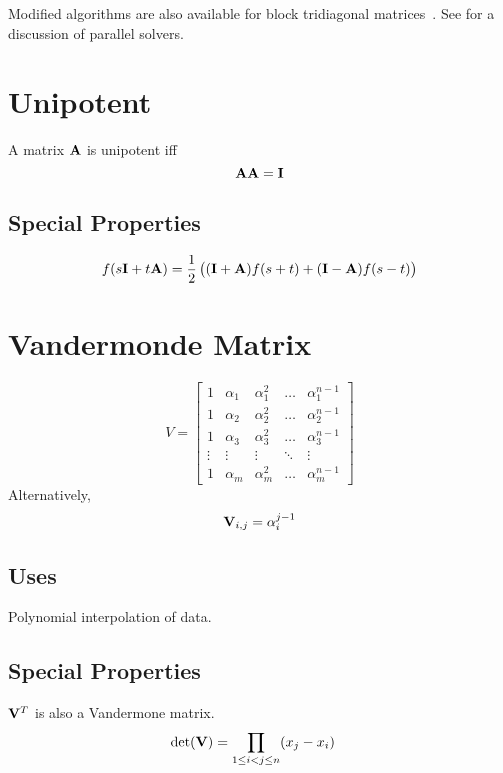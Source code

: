 Modified algorithms are also available for block tridiagonal matrices~\citep[]{Quateroni2007}. See \citep[]{Gallopoulos2016} for a discussion of parallel solvers.



\section{Unipotent}
\label{sec:rogue:unipotent}
A matrix $\mathbf{A}$ is unipotent iff
\begin{equation}
\mathbf{A}\mathbf{A} = \mathbf{I}
\end{equation}

\subsection*{Special Properties}
\begin{align}
  f(s\mathbf{I}+t\mathbf{A}) = \frac{1}{2}\left((\mathbf{I}+\mathbf{A})f(s+t) + (\mathbf{I}-\mathbf{A})f(s-t)\right)
\end{align}



\section{Vandermonde Matrix}
\begin{equation}
V=
\begin{bmatrix}
1      & \alpha_1 & \alpha_1^2 & \dots  & \alpha_1^{n-1} \\
1      & \alpha_2 & \alpha_2^2 & \dots  & \alpha_2^{n-1} \\
1      & \alpha_3 & \alpha_3^2 & \dots  & \alpha_3^{n-1} \\
\vdots & \vdots   & \vdots     & \ddots & \vdots         \\
1      & \alpha_m & \alpha_m^2 & \dots  & \alpha_m^{n-1}
\end{bmatrix}
\end{equation} %
Alternatively,
\begin{equation}
\mathbf{V}_{i,j} = \alpha_i^{j-1}
\end{equation}

\subsection*{Uses}
Polynomial interpolation of data.

\subsection*{Special Properties}
$\mathbf{V}^T$ is also a Vandermone matrix.
\begin{align}
\det(\mathbf{V})&=\prod_{1\le i < j \le n} (x_j-x_i)
\end{align} %